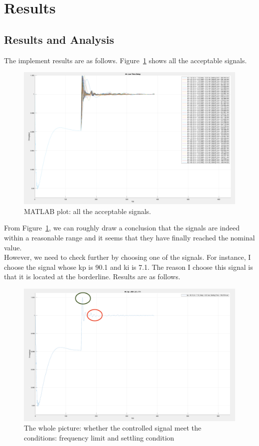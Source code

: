 \section{Results} %
\label{section4.4}
\subsection{Results and Analysis} %
The implement results are as follows. Figure~\ref{4_4_1_result1} shows all the acceptable signals.

\begin{figure}[htbp]
\centering
\includegraphics[width = .819\textwidth]{figure/4_4_1_result1.png}
\caption{MATLAB plot: all the acceptable signals.}
\label{4_4_1_result1}
\end{figure}

From Figure~\ref{4_4_1_result1}, we can roughly draw a conclusion that the signals are indeed within a reasonable range and it seems that they have finally reached the nominal value. \\

However, we need to check further by choosing one of the signals. For instance, I choose the signal whose kp is 90.1 and ki is 7.1. The reason I choose this signal is that it is located at the borderline. Results are as follows. \\

\begin{figure}[htbp]
\centering
\includegraphics[width = .819\textwidth]{figure/4_4_1_result2.png}
\caption{The whole picture: whether the controlled signal meet the conditions: frequency limit and settling condition}
\label{4_4_1_result2}
\end{figure}


